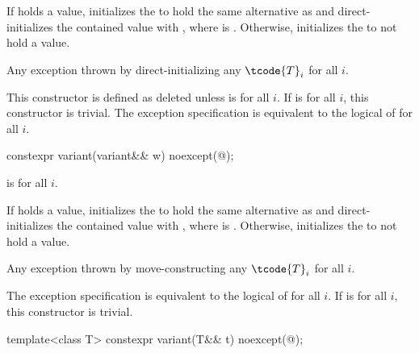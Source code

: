 \begin{itemdescr}
\pnum
\effects
If  holds a value, initializes the  to hold the same
alternative as  and direct-initializes the contained value
with , where  is .
Otherwise, initializes the  to not hold a value.

\pnum
\throws
Any exception thrown by direct-initializing any $\tcode{T}_i$ for all $i$.

\pnum
\remarks
This constructor is defined as deleted unless
 is  for all $i$.
If 
is  for all $i$, this constructor is trivial.
The exception specification is equivalent to the logical  of
 for all $i$.
\end{itemdescr}

%
\begin{itemdecl}
constexpr variant(variant&& w) noexcept(@\seebelow@);
\end{itemdecl}

\begin{itemdescr}
\pnum
\constraints
{} is  for all $i$.

\pnum
\effects
If  holds a value, initializes the  to hold the same
alternative as  and direct-initializes the contained value with
, where  is .
Otherwise, initializes the  to not hold a value.

\pnum
\throws
Any exception thrown by move-constructing any $\tcode{T}_i$ for all $i$.

\pnum
\remarks
The exception specification is equivalent to the logical  of
 for all $i$.
If 
is  for all $i$, this constructor is trivial.
\end{itemdescr}

%
\begin{itemdecl}
template<class T> constexpr variant(T&& t) noexcept(@\seebelow@);
\end{itemdecl}

